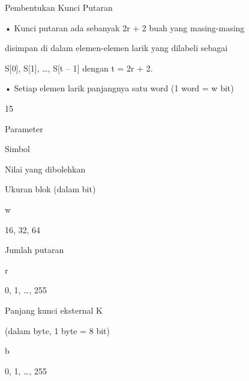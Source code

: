 \documentclass{article}
\begin{document}

Pembentukan Kunci Putaran

• Kunci putaran ada sebanyak 2r + 2 buah yang masing-masing 

disimpan di dalam elemen-elemen larik yang dilabeli sebagai 

S[0], S[1], …, S[t – 1] dengan t = 2r + 2. 

• Setiap elemen larik panjangnya satu word (1 word = w bit)

15


Parameter 

Simbol 

Nilai yang dibolehkan 

Ukuran blok (dalam bit) 

w 

16, 32, 64 

Jumlah putaran 

r 

0, 1, …, 255 

Panjang kunci eksternal K 

(dalam byte, 1 byte = 8 bit) 

b 

0, 1, …, 255
\end{document}
